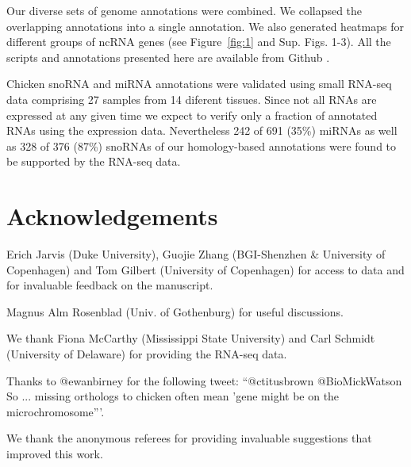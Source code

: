 \documentclass[10pt]{bmc_article}
\newcommand {\ppg}[1]{\textcolor{blue}{#1}}
\newenvironment{bmcformat}{\begin{raggedright}\baselineskip20pt\sloppy\setboolean{publ}{false}}{\end{raggedright}\baselineskip20pt\sloppy}
\begin{document}
\begin{bmcformat}

Our diverse sets of genome annotations were combined. We collapsed the
overlapping annotations into a single annotation. We also generated
heatmaps for different groups of ncRNA genes (see Figure~\ref{fig:1}
and Sup. Figs. 1-3). All the scripts and annotations presented here
are available from Github \cite{gitrepo}.

Chicken snoRNA and miRNA annotations were validated using small
RNA-seq data comprising 27 samples from 14 diferent tissues. Since not
all RNAs are expressed at any given time we expect to verify only a
fraction of annotated RNAs using the expression data. Nevertheless 242
of 691 (35\%) miRNAs as well as 328 of 376 (87\%) snoRNAs of our
homology-based annotations were found to be supported by the RNA-seq
data.


\section*{Acknowledgements}

Erich Jarvis (Duke University), Guojie Zhang (BGI-Shenzhen \&
University of Copenhagen) and Tom Gilbert (University of Copenhagen)
for access to data and for invaluable feedback on the manuscript.

Magnus Alm Rosenblad (Univ. of Gothenburg) for useful discussions.

We thank Fiona McCarthy (Mississippi State University) and Carl
Schmidt (University of Delaware) for providing the RNA-seq data.

Thanks to @ewanbirney for the following tweet: ``@ctitusbrown
@BioMickWatson So ... missing orthologs to chicken often mean 'gene
might be on the microchromosome'''. 

We thank the anonymous referees for providing invaluable suggestions
that improved this work. 



{
  } %



\end{bmcformat}
\end{document}
